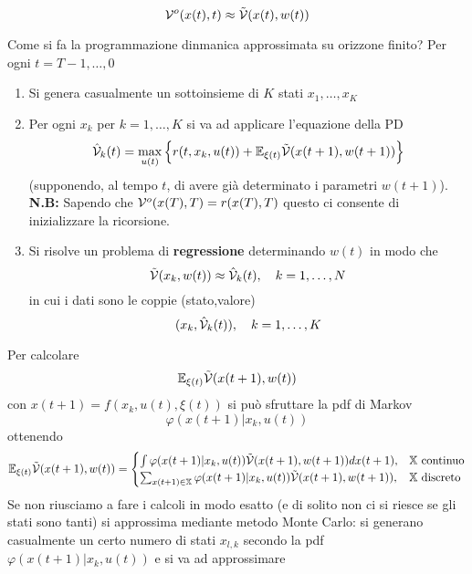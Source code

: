 \begin{equation}
\mathcal{V}^o(x(t),t) \approx \tilde{\mathcal{V}}(x(t),w(t))
\end{equation} 
\begin{center}
\end{center}
Come si fa la programmazione dinmanica approssimata su orizzone finito?
Per ogni $t=T-1, \dots, 0$
\begin{enumerate}
\item Si genera casualmente un sottoinsieme di $K$ stati $x_1, \dots, x_K$
\item Per ogni $x_k$ per $k=1,\dots, K$ si va ad applicare l'equazione della PD
    \begin{equation}
    \hat{\mathcal{V}}_k(t) = \max_{u(t)} \Big \{ r(t, x_k, u(t)) + \mathbb{E}_{\xi(t)} \tilde{\mathcal{V}}(x(t+1), w(t+1)) \Big \}
    \end{equation} (supponendo, al tempo $t$, di avere gi\`a determinato i parametri $w(t+1)$).
    \textbf{N.B:} Sapendo che $\mathcal{V}^o(x(T),T) = r(x(T),T)$ questo ci consente di inizializzare la ricorsione.
\item Si risolve un problema di \textbf{regressione} determinando $w(t)$ in modo che 
    \begin{equation}
    \tilde{\mathcal{V}}(x_k, w(t)) \approx \hat{\mathcal{V}}_k(t), \quad k=1, \dots, N
    \end{equation} in cui i dati sono le coppie (stato,valore)
    \begin{equation}
    (x_k, \hat{\mathcal{V}}_k(t)), \quad k=1, \dots, K
    \end{equation}
\end{enumerate}
Per calcolare
\begin{equation}
\mathbb{E}_{\xi(t)} \tilde{\mathcal{V}}(x(t+1), w(t))
\end{equation} con $x(t+1) = f(x_k, u(t), \xi(t))$ si pu\`o sfruttare la pdf di Markov
\begin{equation}
\varphi (x(t+1)|x_k, u(t))
\end{equation} ottenendo
\begin{equation}
\mathbb{E}_{\xi(t)} \tilde{\mathcal{V}}(x(t+1), w(t)) = \begin{cases}
\int \varphi(x(t+1)|x_k, u(t)) \tilde{\mathcal{V}}(x(t+1),w(t+1)) dx(t+1), & \text{$\mathbb{X}$ continuo} \\
\sum_{x(t+1) \in \mathbb{X}} \varphi(x(t+1)|x_k, u(t)) \tilde{\mathcal{V}}(x(t+1),w(t+1)), & \text{$\mathbb{X}$ discreto}
\end{cases}
\end{equation} Se non riusciamo a fare i calcoli in modo esatto (e di solito non ci si riesce se gli stati sono tanti) si approssima mediante metodo Monte Carlo: si generano casualmente un certo numero di stati $x_{l,k}$ secondo la pdf $\varphi(x(t+1)|x_k, u(t))$ e si va ad approssimare
